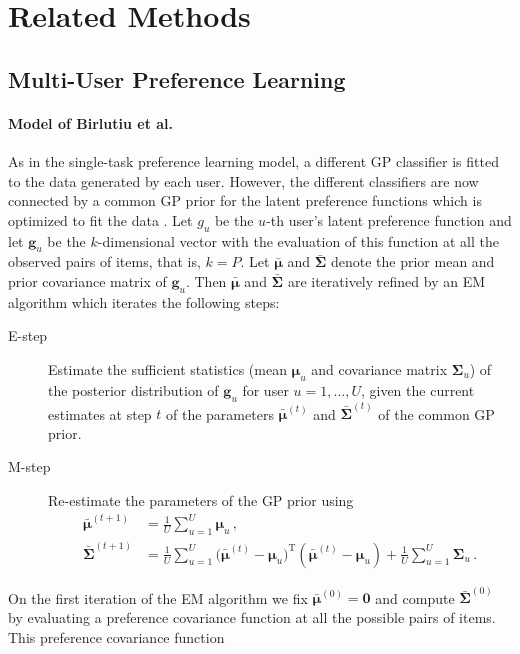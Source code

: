 \section{Related Methods \label{sec:relatedWork}}

\subsection{Multi-User Preference Learning}

\paragraph{Model of Birlutiu et al.}

As in the single-task preference learning model, a different GP classifier is
fitted to the data generated by each user. However, the different classifiers are now connected by a
common GP prior for the latent preference functions which is optimized to fit the data \cite{birlutiu2009}.
Let $g_u$ be the $u$-th user's latent preference function and let 
$\bm g_u$ be the $k$-dimensional vector with the evaluation of this function at all the observed pairs of items, that is, $k = P$.
Let $\bar{\bm \mu}$ and $\bar{\bm \Sigma}$ denote the prior mean and prior covariance matrix of $\bm g_u$.
Then $\bar{\bm \mu}$ and $\bar{\bm \Sigma}$ are iteratively refined by an EM algorithm which iterates the following steps:
\begin{description}
\item[E-step] Estimate the sufficient statistics (mean $\bm \mu_u$ and covariance matrix $\bm \Sigma_u$) of the posterior distribution of $\bm g_u$
for user $u=1,\ldots,U$, given the current estimates at step $t$ of the parameters $\bar{\bm \mu}^{(t)}$ and $\bar{\bm \Sigma}^{(t)}$ of the
common GP prior.
\item[M-step] Re-estimate the parameters of the GP prior using
\begin{align}
\bar{\bm \mu}^{(t+1)} & = \frac{1}{U} \sum_{u=1}^U \bm \mu_u\,,\nonumber\\
\bar{\bm \Sigma}^{(t+1)} & = \frac{1}{U} \sum_{u=1}^U \bm (\bar{\bm \mu}^{(t)} - \bm \mu_u)^\text{T} (\bar{\bm \mu}^{(t)} - \bm \mu_u) + 
\frac{1}{U}\sum_{u=1}^U \bm \Sigma_u \,.\nonumber
\end{align}
\end{description}
On the first iteration of the EM algorithm we fix $\bar{\bm \mu}^{(0)} = \bm 0$ and compute $\bar{\bm \Sigma}^{(0)}$ 
by evaluating a preference covariance function at all the possible pairs of items. This preference covariance function
